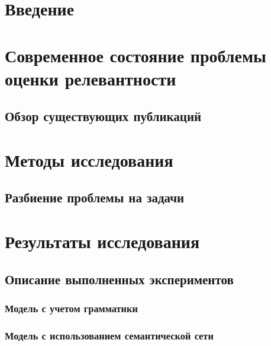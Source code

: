 \documentclass{memoir}
\begin{document}
\tableofcontents
\chapter*{Введение}

\chapter{Современное состояние проблемы оценки релевантности}
\section{Обзор существующих публикаций}

\chapter{Методы исследования}

\section{Разбиение проблемы на задачи}

\chapter{Результаты исследования}
\section{Описание выполненных экспериментов}

\subsection{Модель с учетом грамматики}

\subsection{Модель с использованием семантической сети}

\printbibliography[title={Список использованных источников},category=cited]
\printbibliography[title={Непроцитированные источники (должно быть пусто)},notcategory=cited]
\end{document}
